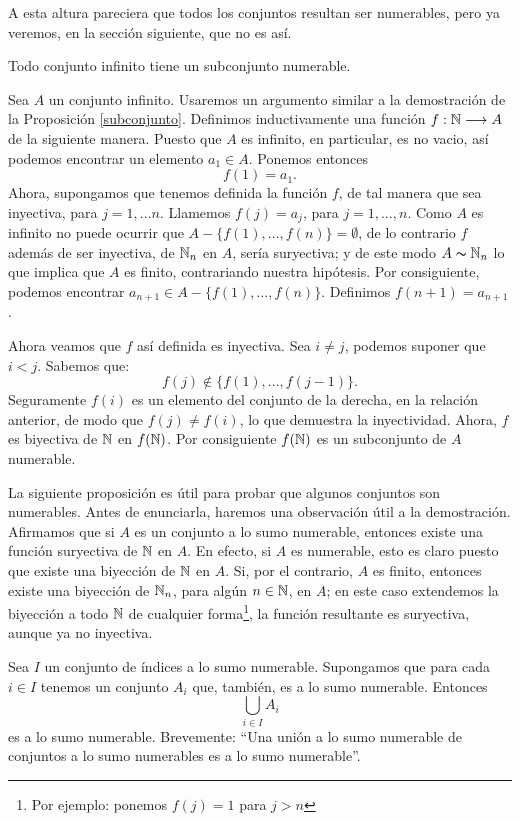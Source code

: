 A esta altura pareciera que
todos los conjuntos resultan ser numerables, pero ya veremos, en
la sección siguiente, que no es así.


\begin{lema}\label{subconjnum} Todo conjunto infinito tiene un
subconjunto numerable.
\end{lema}

\begin{demo} Sea $A$ un conjunto infinito. Usaremos un argumento similar a la demostración de
la Proposición \vref{subconjunto}. Definimos inductivamente una
función $f:\mathbb{N}\longrightarrow A$  de la siguiente manera. Puesto
que $A$ es infinito, en particular, es no vacio, así podemos
encontrar un elemento $a_1\in A$. Ponemos entonces
\[f(1)=a_1.\]
Ahora, supongamos que tenemos definida la función $f$, de tal
manera que sea inyectiva, para $j=1,\dots n$. Llamemos $f(j)=a_j$,
para $j=1,\dots , n$. Como $A$ es infinito no puede ocurrir que
$A-\{f(1),\dots,f(n)\}=\emptyset$, de lo contrario $f$ además de
ser inyectiva, de $\mathbb{N}_n$ en $A$, sería suryectiva; y de este
modo $A\thicksim\mathbb{N}_n$ lo que implica que $A$ es finito,
contrariando nuestra hipótesis. Por consiguiente, podemos
encontrar $a_{n+1}\in A-\{f(1),\dots,f(n)\}$. Definimos
$f(n+1)=a_{n+1}$.

Ahora veamos que $f$ así definida es inyectiva. Sea $i\neq
j $, podemos suponer que $i<j$. Sabemos que:
\[f(j)\notin \{f(1),\dots,f(j-1)\}.\]
Seguramente $f(i)$ es un elemento del conjunto de la derecha, en
la relación anterior, de modo que $f(j)\neq f(i)$, lo que
demuestra la inyectividad. Ahora, $f$ es biyectiva de $\mathbb{N}$ en
$f(\mathbb{N})$. Por consiguiente $f(\mathbb{N})$ es un subconjunto de $A$
numerable. 
\end{demo}

La siguiente proposición es útil para probar que algunos
conjuntos son numerables. Antes de enunciarla, haremos una
observación útil a la demostración. Afirmamos que si $A$ es
un conjunto a lo sumo numerable, entonces existe una función
suryectiva de $\mathbb{N}$ en $A$. En efecto, si $A$ es numerable, esto
es claro puesto que existe una biyección de $\mathbb{N}$ en $A$. Si,
por el contrario, $A$ es finito, entonces existe una biyección
de $\mathbb{N}_n$, para algún $n\in\mathbb{N}$, en $A$; en este caso
extendemos la biyección a todo $\mathbb{N}$ de cualquier
forma\footnote{Por ejemplo: ponemos $f(j)=1$ para $j>n$}, la
función resultante es suryectiva, aunque ya no inyectiva.

\begin{proposicion}\label{unionnumdenum} Sea $I$ un conjunto de índices a lo sumo
numerable. Supongamos que para cada $i\in I$ tenemos un conjunto
$A_i$ que, también, es a lo sumo numerable. Entonces
\[\bigcup_{i\in I}A_i\]
es a lo sumo numerable. Brevemente: ``Una unión a lo sumo
numerable de conjuntos a lo sumo numerables es a lo sumo
numerable''.
\end{proposicion}

